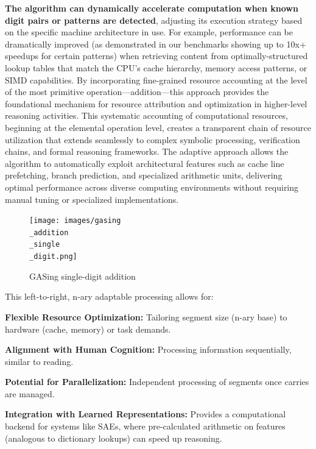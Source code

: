 \textbf{The algorithm can dynamically accelerate computation when known digit pairs or patterns are detected}, adjusting its execution strategy based on the specific machine architecture in use. For example, performance can be dramatically improved (as demonstrated in our benchmarks showing up to 10x+ speedups for certain patterns) when retrieving content from optimally-structured lookup tables that match the CPU's cache hierarchy, memory access patterns, or SIMD capabilities. By incorporating fine-grained resource accounting at the level of the most primitive operation—addition—this approach provides the foundational mechanism for resource attribution and optimization in higher-level reasoning activities. This systematic accounting of computational resources, beginning at the elemental operation level, creates a transparent chain of resource utilization that extends seamlessly to complex symbolic processing, verification chains, and formal reasoning frameworks. The adaptive approach allows the algorithm to automatically exploit architectural features such as cache line prefetching, branch prediction, and specialized arithmetic units, delivering optimal performance across diverse computing environments without requiring manual tuning or specialized implementations.



\begin{figure}[H]
  \centering
  \texttt{[image: images/gasing\\\_addition\\\_single\\\_digit.png]}
  \caption{GASing single-digit addition}
  \label{fig:gasingadditionsingledigit}
\end{figure}



This left-to-right, n-ary adaptable processing allows for:

\noindent\textbf{\textbf{Flexible Resource Optimization:} } Tailoring segment size (n-ary base) to hardware (cache, memory) or task demands.


\noindent\textbf{\textbf{Alignment with Human Cognition:} } Processing information sequentially, similar to reading.


\noindent\textbf{\textbf{Potential for Parallelization:} } Independent processing of segments once carries are managed.


\noindent\textbf{\textbf{Integration with Learned Representations:} } Provides a computational backend for systems like SAEs, where pre-calculated arithmetic on features (analogous to dictionary lookups) can speed up reasoning.


